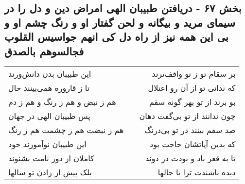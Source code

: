 \begin{center}
\section*{بخش ۶۷ - دریافتن طبیبان الهی امراض دین و دل را در سیمای مرید و بیگانه و لحن گفتار او و رنگ چشم او و بی این همه نیز از راه دل کی انهم جواسیس القلوب فجالسوهم بالصدق}
\label{sec:sh067}
\begin{longtable}{l p{0.5cm} r}
این طبیبان بدن دانش‌ورند
&&
بر سقام تو ز تو واقف‌ترند
\\
تا ز قاروره همی‌بینند حال
&&
که ندانی تو از آن رو اعتلال
\\
هم ز نبض و هم ز رنگ و هم ز دم
&&
بو برند از تو بهر گونه سقم
\\
پس طبیبان الهی در جهان
&&
چون ندانند از تو بی‌گفت دهان
\\
هم ز نبضت هم ز چشمت هم ز رنگ
&&
صد سقم بینند در تو بی‌درنگ
\\
این طبیبان نوآموزند خود
&&
که بدین آیاتشان حاجت بود
\\
کاملان از دور نامت بشنوند
&&
تا به قعر باد و بودت در دوند
\\
بلک پیش از زادن تو سالها
&&
دیده باشندت ترا با حالها
\\
\end{longtable}
\end{center}
